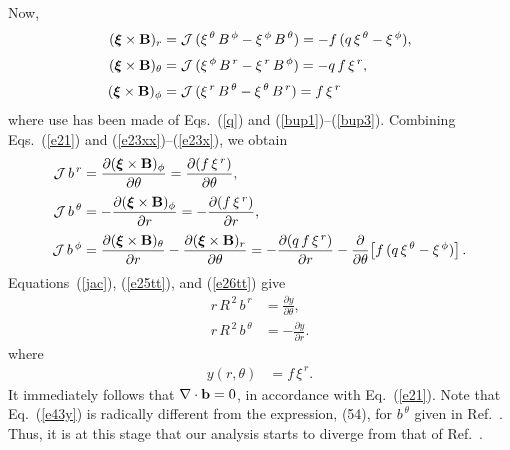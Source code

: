 \documentclass[12pt,prb,aps]{revtex4-1}
\newcommand {\bxi}{\mbox{\boldmath$\xi$}}
\begin{document}
Now,\cite{tj}
\begin{align}
(\bxi\times {\bf B})_r&= {\cal J}\,(\xi^{\,\theta}\,B^{\,\phi} - \xi^{\,\phi}\,B^{\,\theta}) = -f\,(q\,\xi^{\,\theta}-\xi^{\,\phi}),\label{e23xx}\\[0.5ex]
(\bxi\times {\bf B})_\theta&= {\cal J}\,(\xi^{\,\phi}\,B^{\,r} - \xi^{\,r}\,B^{\,\phi}) = -q\,f\,\xi^{\,r},\\[0.5ex]
(\bxi\times {\bf B})_\phi &= {\cal J}\,(\xi^{\,r}\,B^{\,\theta} - \xi^{\,\theta}\,B^{\,r})= f\,\xi^{\,r}\label{e23x}
\end{align}
where use has been made of  Eqs.~(\ref{q}) and (\ref{bup1})--(\ref{bup3}).
 Combining Eqs.~(\ref{e21}) and (\ref{e23xx})--(\ref{e23x}), we obtain\,\cite{tj}
\begin{align}
{\cal J}\,b^{\,r} &= \frac{\partial (\bxi\times {\bf B})_\phi }{\partial\theta}= \frac{\partial (f\,\xi^{\,r})}{\partial\theta},\label{e25tt}\\[0.5ex]
{\cal J}\,b^{\,\theta} &=-\frac{\partial (\bxi\times {\bf B})_\phi }{\partial r}= -\frac{\partial (f\,\xi^{\,r})}{\partial r},\label{e26tt}\\[0.5ex]
{\cal J}\,b^{\,\phi}&=\frac{\partial (\bxi\times {\bf B})_\theta}{\partial r}-\frac{\partial (\bxi\times {\bf B})_r }{\partial \theta}=
 -\frac{\partial (q\,f\,\xi^{\,r})}{\partial r} - \frac{\partial}{\partial\theta}\!\left[f\,(q\,\xi^{\,\theta}-\xi^{\,\phi})\right].\label{e27tt}
\end{align}
Equations~(\ref{jac}), (\ref{e25tt}), and (\ref{e26tt}) give\,\cite{tj}
\begin{align}\label{e41}
r\,R^{\,2}\,b^{\,r}& = \frac{\partial y}{\partial\theta},\\[0.5ex]
r\,R^{\,2}\,b^{\,\theta} &= - \frac{\partial y}{\partial r}.\label{e43y}
\end{align}
where 
\begin{align}\label{e42}
y(r,\theta) &=f\,\xi^{\,r}.
\end{align}
It immediately follows that $\nabla\cdot{\bf b} =0$, in accordance with  Eq.~(\ref{e21}). 
Note that Eq.~(\ref{e43y}) is radically different from the expression, (54), for $b^{\,\theta}$ given in Ref.~. Thus, it is at this stage that our analysis
starts to diverge from that of Ref.~.
\end{document}
